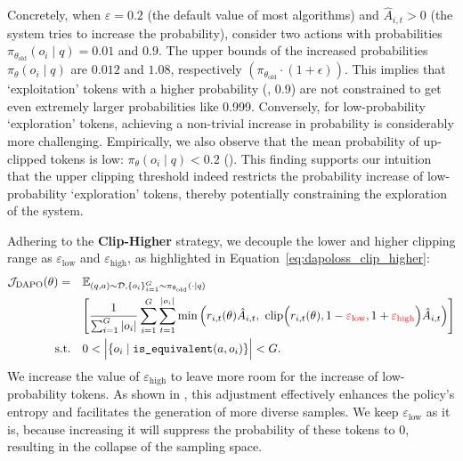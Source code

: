 Concretely, when $\varepsilon = 0.2$ (the default value of most algorithms) and $\hat{A}_{i,t} > 0$ (the system tries to increase the probability), consider two actions with probabilities $\pi_{\theta_{\text{old}}}(o_i \mid q) = 0.01$ and $0.9$. The upper bounds of the increased probabilities $\pi_{\theta}(o_i \mid q)$ are $0.012$ and $1.08$, respectively $\left(\pi_{\theta_{\text{old}}} \cdot (1 + \epsilon)\right)$. 
This implies that `exploitation' tokens with a higher probability (\eg, 0.9) are not constrained to get even extremely larger probabilities like 0.999. Conversely, for low-probability `exploration' tokens, achieving a non-trivial increase in probability is considerably more challenging.
Empirically, we also observe that the mean probability of up-clipped tokens is low: $\pi_{\theta}(o_i \mid q) < 0.2$ (). This finding supports our intuition that the upper clipping threshold indeed restricts the probability increase of low-probability `exploration' tokens, thereby potentially constraining the exploration of the system.

Adhering to the \textbf{Clip-Higher} strategy, we decouple the lower and higher clipping range as $\varepsilon_\text{low}$ and $\varepsilon_\text{high}$, as highlighted in Equation~\ref{eq:dapoloss_clip_higher}:
\begin{equation}
\begin{aligned}
\mathcal{J}_{\text{DAPO}}(\theta) = \quad&\mathbb{E}_{(q,a)\sim\mathcal{D}, \{o_i\}_{i=1}^G\sim \pi_{\theta_\text{old}}(\cdot\mid q)}\\&
\Bigg[\frac{1}{\sum_{i=1}^{G}|o_i|}\sum_{i=1}^{G}\sum_{t=1}^{|o_i|} 
\min \Big( r_{i,t}(\theta) \hat{A}_{i,t},  
\ \text{clip} \Big( r_{i,t}(\theta), 1 - {\color{red}\varepsilon_{\text{low}}}, 1 + {\color{red}\varepsilon_{\text{high}}} \Big) \hat{A}_{i,t} \Big) \Bigg]\\
\text{s.t.}\quad& 0< \Big|\{o_i\mid\texttt{is\_equivalent}(a,o_i)\}\Big|< G.
\label{eq:dapoloss_clip_higher}
\end{aligned}
\end{equation}
We increase the value of \( \varepsilon_{\text{high}} \) to leave more room for the increase of low-probability tokens. As shown in , this adjustment effectively enhances the policy's entropy and facilitates the generation of more diverse samples.
We keep \( \varepsilon_{\text{low}} \) as it is, because increasing it will suppress the probability of these tokens to $0$, resulting in the collapse of the sampling space.

